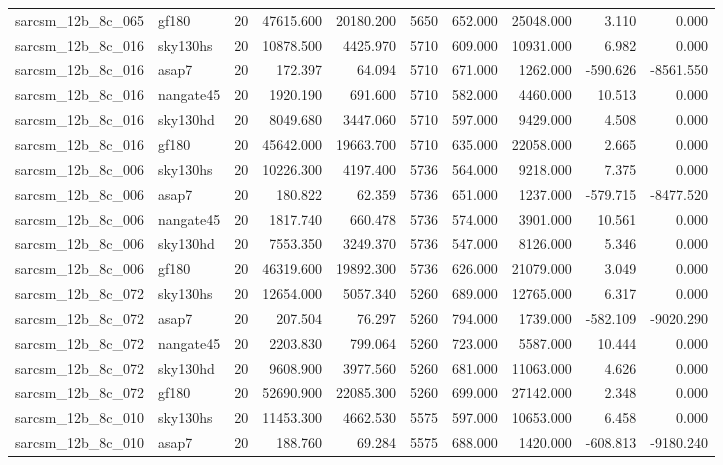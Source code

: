 \documentclass{article}
\begin{document}
\begin{longtable}{llrrrrrrrr}
sarcsm\_12b\_8c\_065 & gf180 & 20 & 47615.600 & 20180.200 & 5650 & 652.000 & 25048.000 & 3.110 & 0.000 \\
sarcsm\_12b\_8c\_016 & sky130hs & 20 & 10878.500 & 4425.970 & 5710 & 609.000 & 10931.000 & 6.982 & 0.000 \\
sarcsm\_12b\_8c\_016 & asap7 & 20 & 172.397 & 64.094 & 5710 & 671.000 & 1262.000 & -590.626 & -8561.550 \\
sarcsm\_12b\_8c\_016 & nangate45 & 20 & 1920.190 & 691.600 & 5710 & 582.000 & 4460.000 & 10.513 & 0.000 \\
sarcsm\_12b\_8c\_016 & sky130hd & 20 & 8049.680 & 3447.060 & 5710 & 597.000 & 9429.000 & 4.508 & 0.000 \\
sarcsm\_12b\_8c\_016 & gf180 & 20 & 45642.000 & 19663.700 & 5710 & 635.000 & 22058.000 & 2.665 & 0.000 \\
sarcsm\_12b\_8c\_006 & sky130hs & 20 & 10226.300 & 4197.400 & 5736 & 564.000 & 9218.000 & 7.375 & 0.000 \\
sarcsm\_12b\_8c\_006 & asap7 & 20 & 180.822 & 62.359 & 5736 & 651.000 & 1237.000 & -579.715 & -8477.520 \\
sarcsm\_12b\_8c\_006 & nangate45 & 20 & 1817.740 & 660.478 & 5736 & 574.000 & 3901.000 & 10.561 & 0.000 \\
sarcsm\_12b\_8c\_006 & sky130hd & 20 & 7553.350 & 3249.370 & 5736 & 547.000 & 8126.000 & 5.346 & 0.000 \\
sarcsm\_12b\_8c\_006 & gf180 & 20 & 46319.600 & 19892.300 & 5736 & 626.000 & 21079.000 & 3.049 & 0.000 \\
sarcsm\_12b\_8c\_072 & sky130hs & 20 & 12654.000 & 5057.340 & 5260 & 689.000 & 12765.000 & 6.317 & 0.000 \\
sarcsm\_12b\_8c\_072 & asap7 & 20 & 207.504 & 76.297 & 5260 & 794.000 & 1739.000 & -582.109 & -9020.290 \\
sarcsm\_12b\_8c\_072 & nangate45 & 20 & 2203.830 & 799.064 & 5260 & 723.000 & 5587.000 & 10.444 & 0.000 \\
sarcsm\_12b\_8c\_072 & sky130hd & 20 & 9608.900 & 3977.560 & 5260 & 681.000 & 11063.000 & 4.626 & 0.000 \\
sarcsm\_12b\_8c\_072 & gf180 & 20 & 52690.900 & 22085.300 & 5260 & 699.000 & 27142.000 & 2.348 & 0.000 \\
sarcsm\_12b\_8c\_010 & sky130hs & 20 & 11453.300 & 4662.530 & 5575 & 597.000 & 10653.000 & 6.458 & 0.000 \\
sarcsm\_12b\_8c\_010 & asap7 & 20 & 188.760 & 69.284 & 5575 & 688.000 & 1420.000 & -608.813 & -9180.240 \\

\end{longtable}
\end{document}
